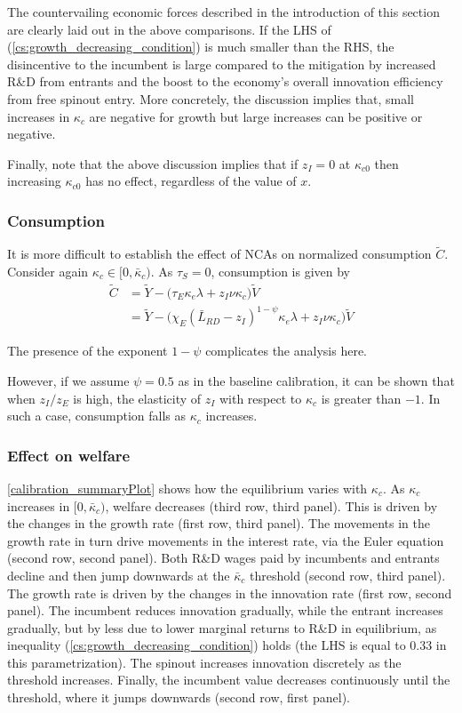 \documentclass[11pt,english]{article}
\theoremstyle{remark}
\begin{document}
The countervailing economic forces described in the introduction of this section are clearly laid out in the above comparisons. If the LHS of (\ref{cs:growth_decreasing_condition}) is much smaller than the RHS, the disincentive to the incumbent is large compared to the mitigation by increased R\&D from entrants and the boost to the economy's overall innovation efficiency from free spinout entry. More concretely, the discussion implies that, small increases in $\kappa_c$ are negative for growth but large increases can be positive or negative.

Finally, note that the above discussion implies that if $z_I = 0$ at $\kappa_{c0}$ then increasing $\kappa_{c0}$ has no effect, regardless of the value of $x$. 

\subsubsection{Consumption}\label{cs:consumption1}

It is more difficult to establish the effect of NCAs on normalized consumption $\tilde{C}$. Consider again $\kappa_c \in [0, \bar{\kappa}_c)$. As $\tau_S = 0$, consumption is given by 
\begin{align}
\tilde{C} &= \tilde{Y} - \Big( \tau_E  \kappa_e \lambda + z_I \nu \kappa_c \Big) \tilde{V} \\
&= \tilde{Y} - \Big( \chi_E (\bar{L}_{RD} - z_I)^{1-\psi} \kappa_e \lambda + z_I \nu \kappa_c \Big) \tilde{V} \label{cs:consumption_eq}
\end{align}

The presence of the exponent $1-\psi$ complicates the analysis here. 

However, if we assume $\psi = 0.5$ as in the baseline calibration, it can be shown that when $z_I / z_E$ is high, the elasticity of $z_I$ with respect to $\kappa_c$ is greater than $-1$. In such a case, consumption falls as $\kappa_c$ increases. 

\subsubsection{Effect on welfare}

\autoref{calibration_summaryPlot} shows how the equilibrium varies with $\kappa_c$. As $\kappa_c$ increases in $[0,\bar{\kappa}_c)$, welfare decreases (third row, third panel). This is driven by the changes in the growth rate (first row, third panel). The movements in the growth rate in turn drive movements in the interest rate, via the Euler equation (second row, second panel). Both R\&D wages paid by incumbents and entrants decline and then jump downwards at the $\bar{\kappa}_c$ threshold (second row, third panel). The growth rate is driven by the changes in the innovation rate (first row, second panel). The incumbent reduces innovation gradually, while the entrant increases gradually, but by less due to lower marginal returns to R\&D in equilibrium, as inequality (\ref{cs:growth_decreasing_condition}) holds (the LHS is equal to 0.33 in this parametrization). The spinout increases innovation discretely as the threshold increases. Finally, the incumbent value decreases continuously until the threshold, where it jumps downwards (second row, first panel).
\end{document}
